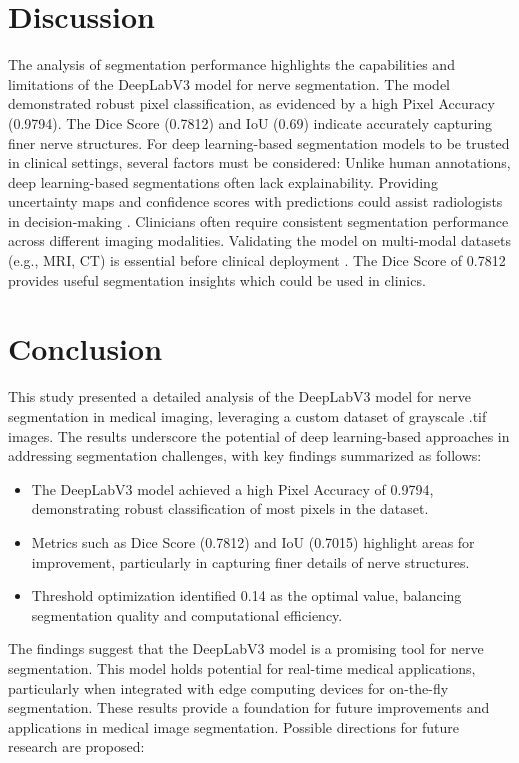 \documentclass{article}
\begin{document}
\section{Discussion}

The analysis of segmentation performance highlights the capabilities and limitations of the DeepLabV3 model for nerve segmentation. The model demonstrated robust pixel classification, as evidenced by a high Pixel Accuracy (0.9794). The Dice Score (0.7812) and IoU (0.69) indicate accurately capturing finer nerve structures. For deep learning-based segmentation models to be trusted in clinical settings, several factors must be considered:
Unlike human annotations, deep learning-based segmentations often lack explainability. Providing uncertainty maps and confidence scores with predictions could assist radiologists in decision-making \cite{tajbakhsh2020embracing}. Clinicians often require consistent segmentation performance across different imaging modalities. Validating the model on multi-modal datasets (e.g., MRI, CT) is essential before clinical deployment \cite{hatamizadeh2022swin}. The Dice Score of 0.7812 provides useful segmentation insights which could be used in clinics. 



\section{Conclusion}

This study presented a detailed analysis of the DeepLabV3 model for nerve segmentation in medical imaging, leveraging a custom dataset of grayscale .tif images. The results underscore the potential of deep learning-based approaches in addressing segmentation challenges, with key findings summarized as follows:
\begin{itemize}
    \item The DeepLabV3 model achieved a high Pixel Accuracy of 0.9794, demonstrating robust classification of most pixels in the dataset.
    \item Metrics such as Dice Score (0.7812) and IoU (0.7015) highlight areas for improvement, particularly in capturing finer details of nerve structures.
    \item Threshold optimization identified 0.14 as the optimal value, balancing segmentation quality and computational efficiency.
\end{itemize}

The findings suggest that the DeepLabV3 model is a promising tool for nerve segmentation. This model holds potential for real-time medical applications, particularly when integrated with edge computing devices for on-the-fly segmentation. These results provide a foundation for future improvements and applications in medical image segmentation. Possible directions for future research are proposed:
\end{document}
